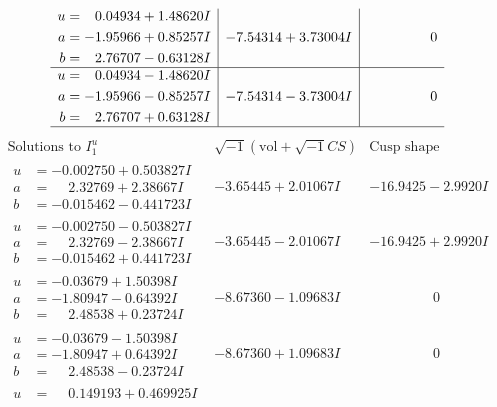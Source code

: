 \documentclass[1p]{elsarticle_modified}
\theoremstyle{definition}
\newcommand{\I}{\sqrt{-1}}
\begin{document}
$$\begin{array}{c|c|c}
\begin{aligned}
u &= \phantom{-}0.04934 + 1.48620 I \\
a &= -1.95966 + 0.85257 I \\
b &= \phantom{-}2.76707 - 0.63128 I\end{aligned}
 & -7.54314 + 3.73004 I & \phantom{-0.000000 } 0 \\ \hline\begin{aligned}
u &= \phantom{-}0.04934 - 1.48620 I \\
a &= -1.95966 - 0.85257 I \\
b &= \phantom{-}2.76707 + 0.63128 I\end{aligned}
 & -7.54314 - 3.73004 I & \phantom{-0.000000 } 0\\
 \hline 
 \end{array}$$\newpage$$\begin{array}{c|c|c}  
\text{Solutions to }I^u_{1}& \I (\text{vol} + \sqrt{-1}CS) & \text{Cusp shape}\\
 \hline 
\begin{aligned}
u &= -0.002750 + 0.503827 I \\
a &= \phantom{-}2.32769 + 2.38667 I \\
b &= -0.015462 - 0.441723 I\end{aligned}
 & -3.65445 + 2.01067 I & -16.9425 - 2.9920 I \\ \hline\begin{aligned}
u &= -0.002750 - 0.503827 I \\
a &= \phantom{-}2.32769 - 2.38667 I \\
b &= -0.015462 + 0.441723 I\end{aligned}
 & -3.65445 - 2.01067 I & -16.9425 + 2.9920 I \\ \hline\begin{aligned}
u &= -0.03679 + 1.50398 I \\
a &= -1.80947 - 0.64392 I \\
b &= \phantom{-}2.48538 + 0.23724 I\end{aligned}
 & -8.67360 - 1.09683 I & \phantom{-0.000000 } 0 \\ \hline\begin{aligned}
u &= -0.03679 - 1.50398 I \\
a &= -1.80947 + 0.64392 I \\
b &= \phantom{-}2.48538 - 0.23724 I\end{aligned}
 & -8.67360 + 1.09683 I & \phantom{-0.000000 } 0 \\ \hline\begin{aligned}
u &= \phantom{-}0.149193 + 0.469925 I \\

\end{aligned}
\end{array}$$
\end{document}
